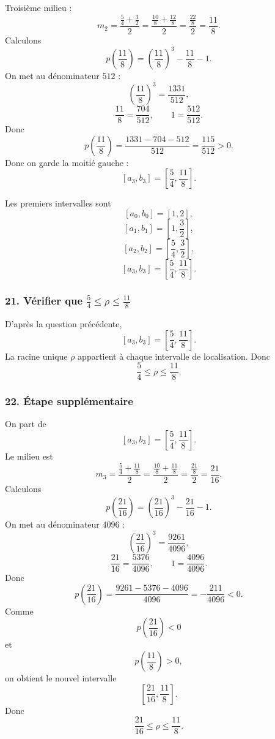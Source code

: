 \documentclass[11pt,a4paper]{article}
\begin{document}
Troisième milieu :
\[
m_2=\frac{\frac54+\frac32}{2}
=
\frac{\frac{10}{8}+\frac{12}{8}}{2}
=
\frac{\frac{22}{8}}{2}
=
\frac{11}{8}.
\]
Calculons
\[
p\left(\frac{11}{8}\right)
=
\left(\frac{11}{8}\right)^3-\frac{11}{8}-1.
\]
On met au dénominateur \(512\) :
\[
\left(\frac{11}{8}\right)^3=\frac{1331}{512},
\]
\[
\frac{11}{8}=\frac{704}{512},
\qquad
1=\frac{512}{512}.
\]
Donc
\[
p\left(\frac{11}{8}\right)
=
\frac{1331-704-512}{512}
=
\frac{115}{512}>0.
\]
Donc on garde la moitié gauche :
\[
[a_3,b_3]=\left[\frac54,\frac{11}{8}\right].
\]

\begin{resultatbox}
Les premiers intervalles sont
\[
[a_0,b_0]=[1,2],
\]
\[
[a_1,b_1]=\left[1,\frac32\right],
\]
\[
[a_2,b_2]=\left[\frac54,\frac32\right],
\]
\[
[a_3,b_3]=\left[\frac54,\frac{11}{8}\right].
\]
\end{resultatbox}


\subsubsection*{21. Vérifier que \(\frac54\leq\rho\leq\frac{11}{8}\)}

D'après la question précédente,
\[
[a_3,b_3]=\left[\frac54,\frac{11}{8}\right].
\]
La racine unique \(\rho\) appartient à chaque intervalle de localisation. Donc
\[
\frac54\leq\rho\leq\frac{11}{8}.
\]


\subsubsection*{22. Étape supplémentaire}

On part de
\[
[a_3,b_3]=\left[\frac54,\frac{11}{8}\right].
\]
Le milieu est
\[
m_3=
\frac{\frac54+\frac{11}{8}}{2}
=
\frac{\frac{10}{8}+\frac{11}{8}}{2}
=
\frac{\frac{21}{8}}{2}
=
\frac{21}{16}.
\]
Calculons
\[
p\left(\frac{21}{16}\right)
=
\left(\frac{21}{16}\right)^3-\frac{21}{16}-1.
\]
On met au dénominateur \(4096\) :
\[
\left(\frac{21}{16}\right)^3=\frac{9261}{4096},
\]
\[
\frac{21}{16}=\frac{5376}{4096},
\qquad
1=\frac{4096}{4096}.
\]
Donc
\[
p\left(\frac{21}{16}\right)
=
\frac{9261-5376-4096}{4096}
=
-\frac{211}{4096}<0.
\]
Comme
\[
p\left(\frac{21}{16}\right)<0
\]
et
\[
p\left(\frac{11}{8}\right)>0,
\]
on obtient le nouvel intervalle
\[
\left[\frac{21}{16},\frac{11}{8}\right].
\]
Donc
\[
\frac{21}{16}\leq\rho\leq\frac{11}{8}.
\]
\end{document}
